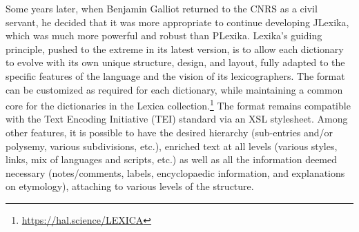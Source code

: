 Some years later, when Benjamin Galliot returned to the CNRS as a civil servant, he decided that it was more appropriate to continue developing JLexika, which was much more powerful and robust than PLexika. Lexika's guiding principle, pushed to the extreme in its latest version, is to allow each dictionary to evolve with its own unique structure, design, and layout, fully adapted to the specific features of the language and the vision of its lexicographers. The format can be customized as required for each dictionary, while maintaining a common core for the dictionaries in the Lexica collection.\footnote{\url{https://hal.science/LEXICA}} The format remains compatible with the Text Encoding Initiative (TEI) standard via an XSL stylesheet. Among other features, it is possible to have the desired hierarchy (sub-entries and/or polysemy, various subdivisions, etc.), enriched text at all levels (various styles, links, mix of languages and scripts, etc.) as well as all the information deemed necessary (notes/comments, labels, encyclopaedic information, and explanations on etymology), attaching to various levels of the structure.


